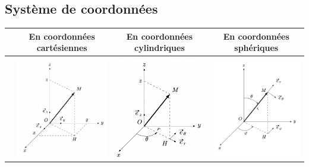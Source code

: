\documentclass[12pt,hidelinks]{article}
\begin{document}
    \subsection{Système de coordonnées}
        \begin{table}[!h]
        \begin{center}
        \begin{adjustwidth}{-1cm}{}
        \begin{tabular}{|c|c|c|c|}
        \hline
        &En coordonnées cartésiennes & En coordonnées cylindriques & En coordonnées sphériques \\ \hline
        &&&\\

        &\includegraphics[width=5.2cm]{Figures/cartesien.png}&\includegraphics[width=5.2cm]{Figures/cylin.png}&\includegraphics[width=5.2cm]{Figures/sphere.png}\\ \hline

\end{tabular}
\end{adjustwidth}
\end{center}
\end{table}
\end{document}
